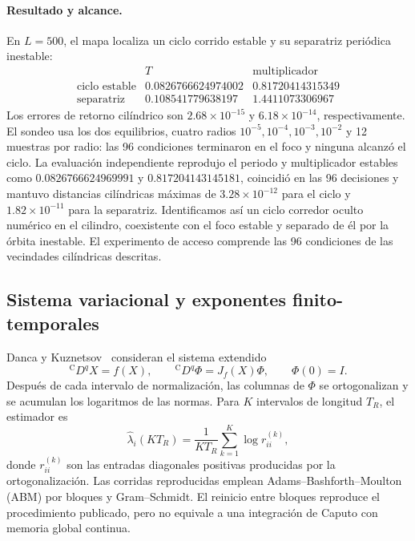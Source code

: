 \paragraph{Resultado y alcance.}
En \(L=500\), el mapa localiza un ciclo corrido estable y su separatriz
periódica inestable:
\begin{equation}
 \begin{array}{c|cc}
 &T&\text{multiplicador}\\ \hline
 \text{ciclo estable}&0.0826766624974002&0.81720414315349\\
 \text{separatriz}&0.108541779638197&1.4411073306967
 \end{array}
 \label{ncbench:eq:pll-cycle-results}
\end{equation}
Los errores de retorno cilíndrico son \(2.68\times10^{-15}\) y
\(6.18\times10^{-14}\), respectivamente. El sondeo usa los dos equilibrios,
cuatro radios \(10^{-5},10^{-4},10^{-3},10^{-2}\) y 12 muestras por radio:
las 96 condiciones terminaron en el foco y ninguna alcanzó el ciclo. La
evaluación independiente reprodujo el periodo y multiplicador estables
como \(0.0826766624969991\) y \(0.817204143145181\), coincidió en las 96
decisiones y mantuvo distancias cilíndricas máximas de
\(3.28\times10^{-12}\) para el ciclo y \(1.82\times10^{-11}\) para la
separatriz. Identificamos así un ciclo corredor oculto numérico en el
cilindro, coexistente con el foco estable y separado de él por la órbita
inestable. El experimento de acceso comprende las 96 condiciones de las
vecindades cilíndricas descritas.

\subsection{Sistema variacional y exponentes finito-temporales}

Danca y Kuznetsov~\cite{DancaKuznetsov2018Lyapunov} consideran el sistema
extendido
\begin{equation}
 {}^{\mathrm C}D^q X=f(X),\qquad
 {}^{\mathrm C}D^q\Phi=J_f(X)\Phi,\qquad \Phi(0)=I.
 \label{ncbench:eq:variational}
\end{equation}
Después de cada intervalo de normalización, las columnas de \(\Phi\) se
ortogonalizan y se acumulan los logaritmos de las normas. Para \(K\) intervalos
de longitud \(T_R\), el estimador es
\begin{equation}
 \widehat\lambda_i(KT_R)=\frac{1}{KT_R}
 \sum_{k=1}^{K}\log r_{ii}^{(k)},
 \label{ncbench:eq:benettin}
\end{equation}
donde \(r_{ii}^{(k)}\) son las entradas diagonales positivas producidas por la
ortogonalización. Las corridas reproducidas emplean Adams--Bashforth--Moulton
(ABM) por bloques y Gram--Schmidt. El reinicio entre bloques reproduce el
procedimiento publicado, pero no equivale a una integración de Caputo con
memoria global continua.

